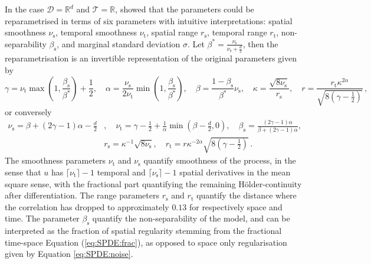 \documentclass[12pt]{article} %
\begin{document}
In the case $\mathcal{D} = \mathbb{R}^d$ and $\mathcal{T} = \mathbb{R}$, \citet{LindgrenBakka} showed that the parameters could be reparametrised in terms of six parameters with intuitive interpretations: spatial smoothness $\nu_\mathrm{s}$, temporal smoothness $\nu_\mathrm{t}$, spatial range $r_\mathrm{s}$, temporal range $r_\mathrm{t}$, non-separability $\beta_\mathrm{s}$, and marginal standard deviation $\sigma$. Let $\beta^* = \frac{\nu_\mathrm{s}}{\nu_\mathrm{s} + \frac{d}{2}}$, then the reparametrisation is an invertible representation of the original parameters
given by
\begin{equation} \label{eq:reparametrisation}
 \gamma = \nu_\mathrm{t} \max \left(1, \frac{\beta_\mathrm{s}}{\beta^*} \right) + \frac{1}{2}, \quad \alpha = \frac{\nu_\mathrm{s}}{2\nu_\mathrm{t}} \min \left(1, \frac{\beta_\mathrm{s}}{\beta^*} \right), \quad
\beta = \frac{1 - \beta_\mathrm{s}}{\beta^*} \nu_\mathrm{s}, \quad 
\kappa = \frac{\sqrt{8 \nu_\mathrm{s}}}{r_\mathrm{s}}, \quad r = \frac{r_\mathrm{t} \kappa^{2 \alpha}}{\sqrt{8(\gamma - \tfrac{1}{2})}} \, ,
\end{equation}
%
or conversely
%
\begin{align*}
\nu_\mathrm{s} = \beta + (2\gamma - 1)\alpha - \tfrac{d}{2}&, \quad
\nu_\mathrm{t} = \gamma - \tfrac{1}{2} + \tfrac{1}{\alpha}\min \left(\beta - \tfrac{d}{2}, 0 \right), \quad
\beta_\mathrm{s} = \frac{(2\gamma - 1)\alpha}{\beta + (2\gamma - 1)\alpha},\\
&r_\mathrm{s} = \kappa^{-1} \sqrt{8 \nu_\mathrm{s}}, \quad
r_\mathrm{t} = r \kappa^{-2 \alpha} \sqrt{8 \left(\gamma - \tfrac{1}{2}\right)} \, .
\end{align*}
The smoothness parameters $\nu_\mathrm{t}$ and $\nu_\mathrm{s}$ quantify smoothness of the process, in the sense that $u$ has $\lceil \nu_\mathrm{t} \rceil-1$ %
temporal and %
$\lceil \nu_\mathrm{s} \rceil-1$ spatial derivatives in the mean square sense, with the fractional part quantifying the remaining Hölder-continuity after differentiation. 
The range parameters $r_\mathrm{s}$ and $r_\mathrm{t}$ quantify the distance where the correlation has dropped to approximately $0.13$ for respectively space and time. The parameter $\beta_\mathrm{s}$ quantify the non-separability of the model, and can be interpreted as the fraction of spatial regularity stemming from the fractional time-space Equation (\ref{eq:SPDE:frac}), as opposed to space only regularisation given by Equation \eqref{eq:SPDE:noise}.
\end{document}
